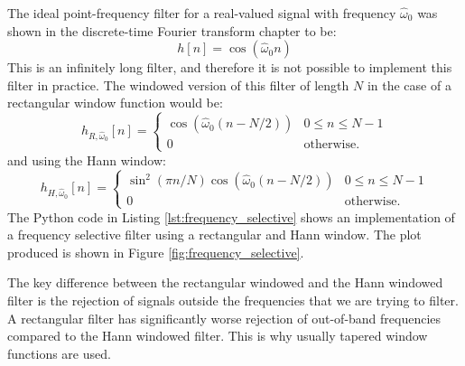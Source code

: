 The ideal point-frequency filter for a real-valued signal with frequency
$\hat{\omega}_0$ was shown in the discrete-time Fourier transform
chapter to be:
\begin{equation}
  h[n] = \cos(\hat{\omega}_0 n)
\end{equation}
This is an infinitely long filter, and therefore it is not possible to
implement this filter in practice. The windowed version of this filter
of length $N$ in the case of a rectangular window function would be:
\begin{equation}
  h_{R,\hat{\omega}_0}[n] =\left\{ \begin{array}{cc}
    \cos(\hat{\omega}_0 (n-N/2)) & 0 \le n \le N-1     \\
    0                            & \mathrm{otherwise}.
  \end{array}
  \right.
\end{equation}
and using the Hann window:
\begin{equation}
  h_{H,\hat{\omega}_0}[n] =\left\{ \begin{array}{cc}
    \sin^2(\pi n/N)\cos(\hat{\omega}_0 (n-N/2)) & 0\le n \le N-1      \\
    0                                           & \mathrm{otherwise}.
  \end{array}
  \right.
\end{equation}
The Python code in Listing \ref{lst:frequency_selective} shows an
implementation of a frequency selective filter using a rectangular and
Hann window. The plot produced is shown in Figure
\ref{fig:frequency_selective}.

The key difference between the rectangular windowed and the Hann
windowed filter is the rejection of signals outside the frequencies that
we are trying to filter. A rectangular filter has significantly worse
rejection of out-of-band frequencies compared to the Hann windowed
filter. This is why usually tapered window functions are used.

